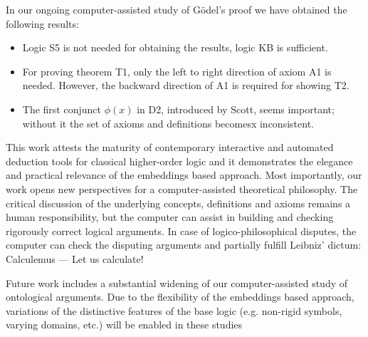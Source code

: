 \documentclass{llncs}
\begin{document}
In our ongoing computer-assisted study of G\"odel's proof we have
obtained the following results:
\begin{itemize}
\item Logic S5 is not needed for obtaining the results, logic KB is
  sufficient.
\item For proving theorem T1, only the left to right direction of
  axiom A1 is needed. However, the backward direction of A1 is
  required for showing T2.
\item The first conjunct $\phi(x)$ in D2, introduced by Scott, seems important; without it the set of axioms and definitions becomesx inconsistent.
\end{itemize}

This work attests the maturity of contemporary interactive and
automated deduction tools for classical higher-order logic and it
demonstrates the elegance and practical relevance of the embeddings
based approach.  Most importantly, our work opens new perspectives for
a computer-assisted theoretical philosophy.  The critical discussion
of the underlying concepts, definitions and axioms remains a human
responsibility, but the computer can assist in building and checking
rigorously correct logical arguments. In case of logico-philosophical
disputes, the computer can check the disputing arguments and partially
fulfill Leibniz' dictum: Calculemus --- Let us calculate!


Future work includes a substantial widening of our computer-assisted
study of ontological arguments. Due to the flexibility of the
embeddings based approach, variations of the distinctive features of
the base logic (e.g. non-rigid symbols, varying domains, etc.)  will
be enabled in these studies



\end{document}
